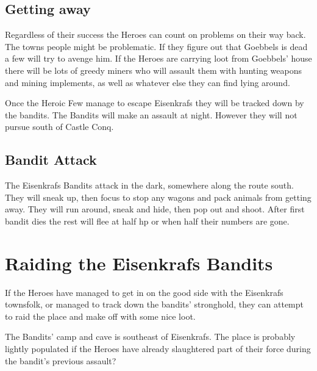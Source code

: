 \subsection*{Getting away}
Regardless of their success the Heroes can count on problems on their way back. The towns people might be problematic. If they figure out that Goebbels is dead a few will try to avenge him. If the Heroes are carrying loot from Goebbels' house there will be lots of greedy miners who will assault them with hunting weapons and mining implements, as well as whatever else they can find lying around.

Once the Heroic Few manage to escape Eisenkrafs they will be tracked down by the bandits. The Bandits will make an assault at night. However they will not pursue south of Castle Conq.


\subsection*{Bandit Attack}
The Eisenkrafs Bandits attack in the dark, somewhere along the route south. They will sneak up, then focus to stop any wagons and pack animals from getting away. They will run around, sneak and hide, then pop out and shoot. After first bandit dies the rest will flee at half hp or when half their numbers are gone.

















\clearpage
{}
\section*{Raiding the Eisenkrafs Bandits}

If the Heroes have managed to get in on the good side with the Eisenkrafs townsfolk, or managed to track down the bandits' stronghold, they can attempt to raid the place and make off with some nice loot.

The Bandits' camp and cave is southeast of Eisenkrafs. The place is probably lightly populated if the Heroes have already slaughtered part of their force during the bandit's previous assault?


